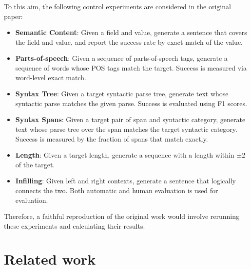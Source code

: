 To this aim, the following control experiments are considered in the original paper:


\begin{itemize}
\item \textbf{Semantic Content}: Given a field and value, generate a sentence that covers the field and value, and report the success rate by exact match of the value.
\item \textbf{Parts-of-speech}: Given a sequence of parts-of-speech tags, generate a sequence of words whose POS tags match the target. Success is measured via word-level exact match.
\item \textbf{Syntax Tree}: Given a target syntactic parse tree, generate text whose syntactic parse matches the given parse. Success is evaluated using F1 scores.
\item \textbf{Syntax Spans}: Given a target pair of span and syntactic category, generate text whose parse tree over the span matches the target syntactic category. Success is measured by the fraction of spans that match exactly.
\item \textbf{Length}: Given a target length, generate a sequence with a length within ±2 of the target.
\item \textbf{Infilling}: Given left and right contexts, generate a sentence that logically connects the two. Both automatic and human evaluation is used for evaluation.
\end{itemize}

Therefore, a faithful reproduction of the original work would involve rerunning these experiments and calculating their results.


\section{Related work}

